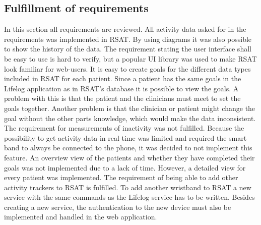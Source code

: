 \documentclass{cslthse-msc}
\begin{document}
\subsection{Fulfillment of requirements}

In this section all requirements are reviewed. All activity data asked for in the requirements was implemented in RSAT. By using diagrams it was also possible to show the history of the data. The requirement stating the user interface shall be easy to use is hard to verify, but a popular UI library was used to make RSAT look familiar for web-users. It is easy to create goals for the different data types included in RSAT for each patient. Since a patient has the same goals in the Lifelog application as in RSAT’s database it is possible to view the goals. A problem with this is that the patient and the clinicians must meet to set the goals together. Another problem is that the clinician or patient might change the goal without the other parts knowledge, which would make the data inconsistent. The requirement for measurements of inactivity was not fulfilled. Because the possibility to get activity data in real time was limited and required the smart band to always be connected to the phone, it was decided to not implement this feature. An overview view of the patients and whether they have completed their goals was not implemented due to a lack of time. However, a detailed view for every patient was implemented. The requirement of being able to add other activity trackers to RSAT is fulfilled. To add another wristband to RSAT a new service with the same commands as the Lifelog service has to be written. Besides creating a new service, the authentication to the new device must also be implemented and handled in the web application.




\end{document}
